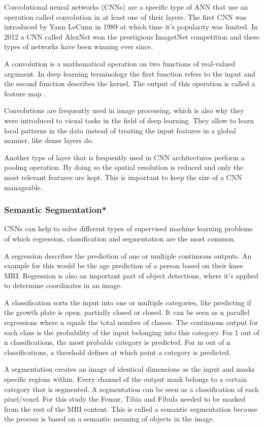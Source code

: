 Convolutional neural networks (CNNs) are a specific type of ANN that use an operation called convolution in at least one of their layers. The first CNN was introduced by Yann LeCunn \cite{LeCun1998} in 1989 at which time it's popularity was limited. In 2012 a CNN called AlexNet \cite{Krizhevsky} won the prestigious ImagetNet competition and these types of networks have been winning ever since.

A convolution is a mathematical operation on two functions of real-valued argument. In deep learning terminology the first function refers to the input and the second function describes the kernel. The output of this operation is called a feature map \cite{Goodfellow2016}.

Convolutions are frequently used in image processing, which is also why they were introduced to visual tasks in the field of deep learning. They allow to learn local patterns in the data instead of treating the input features in a global manner, like dense layers do.

Another type of layer that is frequently used in CNN architectures perform a pooling operation. By doing so the spatial resolution is reduced and only the most relevant features are kept. This is important to keep the size of a CNN manageable.

\subsubsection{Semantic Segmentation*}

CNNs can help to solve different types of supervised machine learning problems of which regression, classification and segmentation are the most common.

A regression describes the prediction of one or multiple continuous outputs. An example for this would be the age prediction of a person based on their knee MRI. Regression is also an important part of object detections, where it's applied to determine coordinates in an image.

A classification sorts the input into one or multiple categories, like predicting if the growth plate is open, partially closed or closed. It can be seen as n parallel regressions where n equals the total number of classes. The continuous output for each class is the probability of the input belonging into this category. For 1 out of n classifications, the most probable category is predicted. For m out of n classifications, a threshold defines at which point a category is predicted.

A segmentation creates an image of identical dimensions as the input and masks specific regions within. Every channel of the output mask belongs to a certain category that is segmented. A segmentation can be seen as a classification of each pixel/voxel. For this study the Femur, Tibia and Fibula needed to be masked from the rest of the MRI content. This is called a semantic segmentation because the process is based on a semantic meaning of objects in the image.

\newpage
